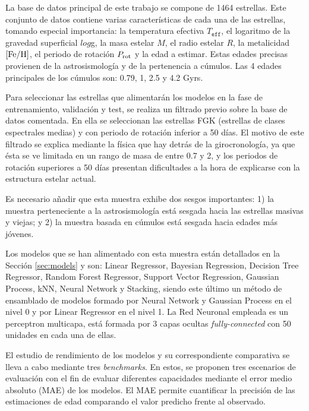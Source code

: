 \vspace{0.5cm}
La base de datos principal de este trabajo se compone de 1464 estrellas. Este conjunto de datos contiene varias características de cada una de las estrellas, tomando especial importancia: la temperatura efectiva $T_\texttt{eff}$, el logaritmo de la gravedad superficial $log$g, la masa estelar $M$, el radio estelar $R$, la metalicidad ${\rm [Fe/H]}$, el periodo de rotación $P_{\rm rot}$ y la edad a estimar. Estas edades precisas provienen de la astrosismología y de la pertenencia a cúmulos. Las 4 edades principales de los cúmulos son: 0.79, 1, 2.5 y 4.2 Gyrs.

Para seleccionar las estrellas que alimentarán los modelos en la fase de entrenamiento, validación y test, se realiza un filtrado previo sobre la base de datos comentada. En ella se seleccionan las estrellas FGK (estrellas de clases espectrales medias) y con periodo de rotación inferior a 50 días. El motivo de este filtrado se explica mediante la física que hay detrás de la girocronología, ya que ésta se ve limitada en un rango de masa de entre 0.7 y 2, y los periodos de rotación superiores a 50 días presentan dificultades a la hora de explicarse con la estructura estelar actual.

Es necesario añadir que esta muestra exhibe dos sesgos importantes: 1) la muestra perteneciente a la astrosismología está sesgada hacia las estrellas masivas y viejas; y 2) la muestra basada en cúmulos está sesgada hacia edades más jóvenes.

\vspace{0.5cm}

Los modelos que se han alimentado con esta muestra están detallados en la Sección \ref{sec:models} y son: Linear Regressor, Bayesian Regression, Decision Tree Regressor, Random Forest Regressor, Support Vector Regression, Gaussian Process, kNN, Neural Network y Stacking, siendo este último un método de ensamblado de modelos formado por Neural Network y Gaussian Process en el nivel 0 y por Linear Regressor en el nivel 1. La Red Neuronal empleada es un perceptron multicapa, está formada por 3 capas ocultas \emph{fully-connected} con 50 unidades en cada una de ellas.

El estudio de rendimiento de los modelos y su correspondiente comparativa se lleva a cabo mediante tres \emph{benchmarks}. En estos, se proponen tres escenarios de evaluación con el fin de evaluar diferentes capacidades mediante el error medio absoluto (MAE) de los modelos. El MAE permite cuantificar la precisión de las estimaciones de edad comparando el valor predicho frente al observado.

